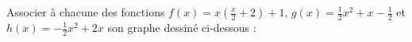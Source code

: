 
\begin{exercice}\label{exosmath-0271}

    Associer à chacune des fonctions \( f(x)=x\left( \frac{ x }{2}+2 \right)+1\), \( g(x)=\frac{ 1 }{2}x^2+x-\frac{ 1 }{2}\) et \( h(x)=-\frac{ 1 }{2}x^2+2x\) son graphe dessiné ci-dessous :

    \begin{center}

    \end{center}

\end{exercice}
